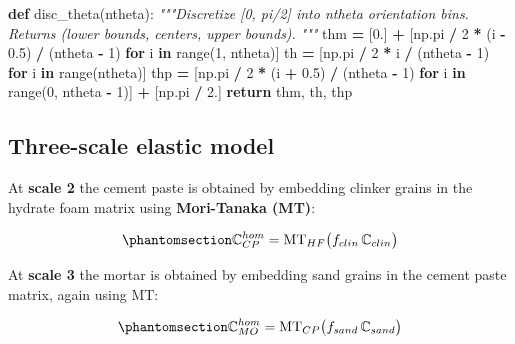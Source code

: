 \documentclass[
  a4paper,
  numbers=noendperiod,
  DIV=12]{scrreprt}
\newenvironment{Shaded}{\begin{snugshade}}{\end{snugshade}}
\newcommand{\BuiltInTok}[1]{#1}
\newcommand{\CommentTok}[1]{\textcolor[rgb]{0.56,0.35,0.01}{\textit{#1}}}
\newcommand{\ControlFlowTok}[1]{\textcolor[rgb]{0.13,0.29,0.53}{\textbf{#1}}}
\newcommand{\DecValTok}[1]{\textcolor[rgb]{0.00,0.00,0.81}{#1}}
\newcommand{\FloatTok}[1]{\textcolor[rgb]{0.00,0.00,0.81}{#1}}
\newcommand{\KeywordTok}[1]{\textcolor[rgb]{0.13,0.29,0.53}{\textbf{#1}}}
\newcommand{\NormalTok}[1]{#1}
\newcommand{\OperatorTok}[1]{\textcolor[rgb]{0.81,0.36,0.00}{\textbf{#1}}}
\begin{document}
\begin{Shaded}
\begin{Highlighting}[]
\KeywordTok{def}\NormalTok{ disc\_theta(ntheta):}
    \CommentTok{"""Discretize [0, pi/2] into ntheta orientation bins.}
\CommentTok{    Returns (lower bounds, centers, upper bounds).}
\CommentTok{    """}
\NormalTok{    thm }\OperatorTok{=}\NormalTok{ [}\FloatTok{0.}\NormalTok{] }\OperatorTok{+}\NormalTok{ [np.pi }\OperatorTok{/} \DecValTok{2} \OperatorTok{*}\NormalTok{ (i }\OperatorTok{{-}} \FloatTok{0.5}\NormalTok{) }\OperatorTok{/}\NormalTok{ (ntheta }\OperatorTok{{-}} \DecValTok{1}\NormalTok{) }\ControlFlowTok{for}\NormalTok{ i }\KeywordTok{in} \BuiltInTok{range}\NormalTok{(}\DecValTok{1}\NormalTok{, ntheta)]}
\NormalTok{    th  }\OperatorTok{=}\NormalTok{ [np.pi }\OperatorTok{/} \DecValTok{2} \OperatorTok{*}\NormalTok{ i }\OperatorTok{/}\NormalTok{ (ntheta }\OperatorTok{{-}} \DecValTok{1}\NormalTok{) }\ControlFlowTok{for}\NormalTok{ i }\KeywordTok{in} \BuiltInTok{range}\NormalTok{(ntheta)]}
\NormalTok{    thp }\OperatorTok{=}\NormalTok{ [np.pi }\OperatorTok{/} \DecValTok{2} \OperatorTok{*}\NormalTok{ (i }\OperatorTok{+} \FloatTok{0.5}\NormalTok{) }\OperatorTok{/}\NormalTok{ (ntheta }\OperatorTok{{-}} \DecValTok{1}\NormalTok{) }\ControlFlowTok{for}\NormalTok{ i }\KeywordTok{in} \BuiltInTok{range}\NormalTok{(}\DecValTok{0}\NormalTok{, ntheta }\OperatorTok{{-}} \DecValTok{1}\NormalTok{)] }\OperatorTok{+}\NormalTok{ [np.pi }\OperatorTok{/} \FloatTok{2.}\NormalTok{]}
    \ControlFlowTok{return}\NormalTok{ thm, th, thp}
\end{Highlighting}
\end{Shaded}

\subsection{Three-scale elastic model}\label{sec-3scale-elas}

At \textbf{scale 2} the cement paste is obtained by embedding clinker
grains in the hydrate foam matrix using \textbf{Mori-Tanaka (MT)}:

\begin{equation}\protect\phantomsection\label{eq-mt-cp}{
\mathbb{C}^{hom}_{CP} = \mathrm{MT}_{HF}\bigl(f_{clin}\,\mathbb{C}_{clin}\bigr)
}\end{equation}

At \textbf{scale 3} the mortar is obtained by embedding sand grains in
the cement paste matrix, again using MT:

\begin{equation}\protect\phantomsection\label{eq-mt-mo}{
\mathbb{C}^{hom}_{MO} = \mathrm{MT}_{CP}\bigl(f_{sand}\,\mathbb{C}_{sand}\bigr)
}\end{equation}
\end{document}
